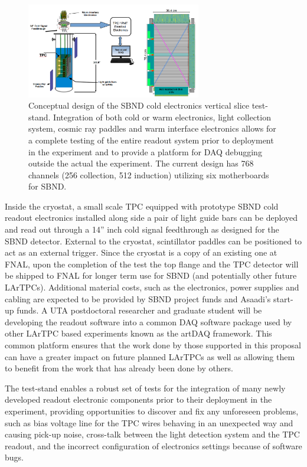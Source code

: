 \begin{figure}[htb]
\centering
\includegraphics[width=0.68\textwidth]{images/teststand3.png}
\caption[]{Conceptual design of the SBND cold electronics vertical slice test-stand. Integration of both cold or warm electronics, light collection system, cosmic ray paddles and warm interface electronics allows for a complete testing of the entire readout system prior to deployment in the experiment and to provide a platform for DAQ debugging outside the actual the experiment. The current design has 768 channels (256 collection, 512 induction) utilizing six motherboards for SBND.}
\label{fig:teststand}
\end{figure} 

Inside the cryostat, a small scale TPC equipped with prototype SBND cold readout electronics installed along side a pair of light guide bars can be deployed and read out through a 14'' inch cold signal feedthrough as designed for the SBND detector. External to the cryostat, scintillator paddles can be positioned to act as an external trigger. Since the cryostat is a copy of an existing one at FNAL, upon the completion of the test the top flange and the TPC detector will be shipped to FNAL for longer term use for SBND (and potentially other future LArTPCs). Additional material costs, such as the electronics, power supplies and cabling are expected to be provided by SBND project funds and Asaadi's start-up funds. A UTA postdoctoral researcher and graduate student will be developing the readout software into a common DAQ software package used by other LArTPC based experiments known as the artDAQ framework. This common platform ensures that the work done by those supported in this proposal can have a greater impact on future planned LArTPCs as well as allowing them to benefit from the work that has already been done by others.

The test-stand enables a robust set of tests for the integration of many newly developed readout electronic components prior to their deployment in the experiment, providing opportunities to discover and fix any unforeseen problems, such as bias voltage line for the TPC wires behaving in an unexpected way and causing pick-up noise, cross-talk between the light detection system and the TPC readout, and the incorrect configuration of electronics settings because of software bugs.   

